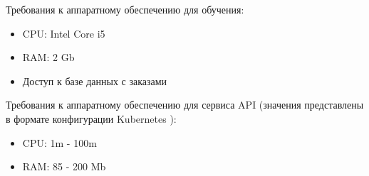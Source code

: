 Требования к аппаратному обеспечению для обучения:
\begin{itemize}
  \item CPU: Intel Core i5
  \item RAM: 2 Gb
  \item Доступ к базе данных с заказами
\end{itemize}

Требования к аппаратному обеспечению для сервиса API (значения представлены в
формате конфигурации Kubernetes \cite{KubernetesResources}):
\begin{itemize}
  \item CPU: 1m - 100m
  \item RAM: 85 - 200 Mb
\end{itemize}
